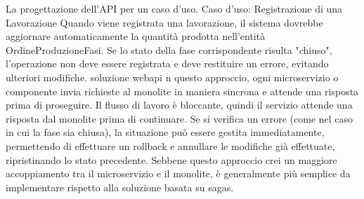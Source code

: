         La progettazione dell'API per un caso d'uso.
        Caso d'uso: Registrazione di una Lavorazione
        Quando viene registrata una lavorazione, il sistema dovrebbe aggiornare automaticamente la quantità prodotta nell'entità OrdineProduzioneFasi. Se lo stato della fase corrispondente risulta "chiuso", l'operazione non deve essere registrata e deve restituire un errore, evitando ulteriori modifiche.
        soluzione webapi n questo approccio, ogni microservizio o componente invia richieste al monolite in maniera sincrona e attende una risposta prima di proseguire. Il flusso di lavoro è bloccante, quindi il servizio attende una risposta dal monolite prima di continuare. Se si verifica un errore (come nel caso in cui la fase sia chiusa), la situazione può essere gestita immediatamente, permettendo di effettuare un rollback e annullare le modifiche già effettuate, ripristinando lo stato precedente. Sebbene questo approccio crei un maggiore accoppiamento tra il microservizio e il monolite, è generalmente più semplice da implementare rispetto alla soluzione basata su sagas.

